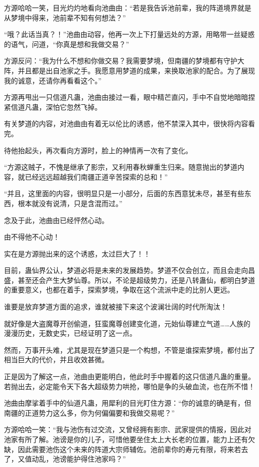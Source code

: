 \begin{this_body}
方源哈哈一笑，目光灼灼地看向池曲由：“若是我告诉池前辈，我的阵道境界就是从梦境中得来，池前辈不知有何想法？”

“哦？此话当真？！”池曲由动容，他再一次上下打量远处的方源，用略带一丝疑惑的语气，问道，“你真是想和我做交易？”

方源反问：“我为什么不想和你做交易？我需要梦境，但南疆的梦境都有守护大阵，并且都是出自池家之手。我愿意用梦道的成果，来换取池家的配合。为了展现我的诚意，还请你再看看这个。”

方源再甩出一只信道凡蛊，池曲由接过一看，眼中精芒直闪，手中不自觉地暗暗捏紧信道凡蛊，深怕它忽然飞掉。

有关梦道的内容，对池曲由有着无以伦比的诱惑，他不禁深入其中，很快将内容看完。

待他抬起头，再次看向方源时，脸上的神情再一次有了变化。

“方源这贼子，不愧是继承了影宗，又利用春秋蝉重生归来。随意抛出的梦道内容，就已经远远超越我们南疆正道辛苦探索的总和！”

“并且，这里面的内容，很明显只是一小部分，后面的东西意犹未尽，甚至有些东西，根本就没有说清，只是含混而过。”

念及于此，池曲由已经怦然心动。

由不得他不心动！

实在是方源抛出来的这个诱惑，太过巨大了！！

目前，蛊仙界公认，梦道必将是未来的发展趋势。梦道不仅会创立，而且会走向昌盛，甚至还会产生大梦仙尊。所以，不论是超级势力，还是八转蛊仙，都明白梦道的重要意义，也都在着手，探索梦境，争取在这个流派中走的比别人更远。

谁要是放弃梦道方面的追求，谁就被接下来这个波澜壮阔的时代所淘汰！

就好像是大盗魔尊开创偷道，狂蛮魔尊创建变化道，元始仙尊建立气道……人族的漫漫历史，无数史实，已经证明了这一点。

然而，万事开头难，尤其是现在梦道只是一个构想，不管是谁探索梦境，都付出了相当巨大的代价，并且收效甚微。

正是因为了解这一点，池曲由更能明白，他此时手中握着的这只信道凡蛊的重量。若抛出去，必定能令天下各大超级势力哄抢，哪怕是争的头破血流，也在所不惜！

池曲由摩挲着手中的仙道凡蛊，用犀利的目光盯住方源：“你的诚意的确是有，但南疆的正道势力这么多，你为何偏偏要和我做交易呢？”

方源哈哈一笑：“我与池伤有过交流，又曾经拥有影宗、武家提供的情报，因此对池家有所了解。池谤是你的儿子，可惜他要坐住太上大长老的位置，能力上还有欠缺，因此需要池伤这个未来的阵道大宗师辅佐。池前辈你的寿元有限，将来若去了，又值动乱，池谤能护得住池家吗？”


\end{this_body}
